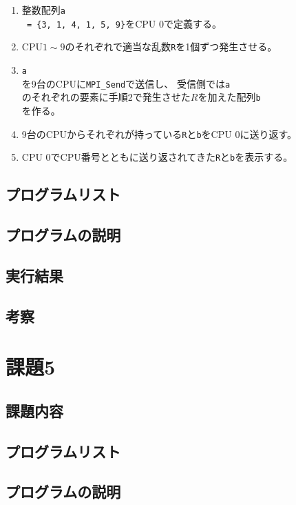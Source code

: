 \documentclass[a4j,titlepage]{jsarticle}
\begin{document}
\begin{enumerate}
  \item 整数配列\texttt{a\[\] = \{3, 1, 4, 1, 5, 9\}}をCPU 0で定義する。
  \item CPU$1 \sim 9$のそれぞれで適当な乱数\texttt{R}を1個ずつ発生させる。
  \item \texttt{a\[\]}を9台のCPUに\texttt{MPI\_Send}で送信し、
        受信側では\texttt{a\[\]}のそれぞれの要素に手順2で発生させた$R$を加えた配列\texttt{b\[\]}を作る。
  \item 9台のCPUからそれぞれが持っている\texttt{R}と\texttt{b}をCPU 0に送り返す。
  \item CPU 0でCPU番号とともに送り返されてきた\texttt{R}と\texttt{b}を表示する。
\end{enumerate}

\subsection{プログラムリスト}

\subsection{プログラムの説明}

\subsection{実行結果}

\subsection{考察}


\section{課題5}
\subsection{課題内容}

\subsection{プログラムリスト}

\subsection{プログラムの説明}
\end{document}
